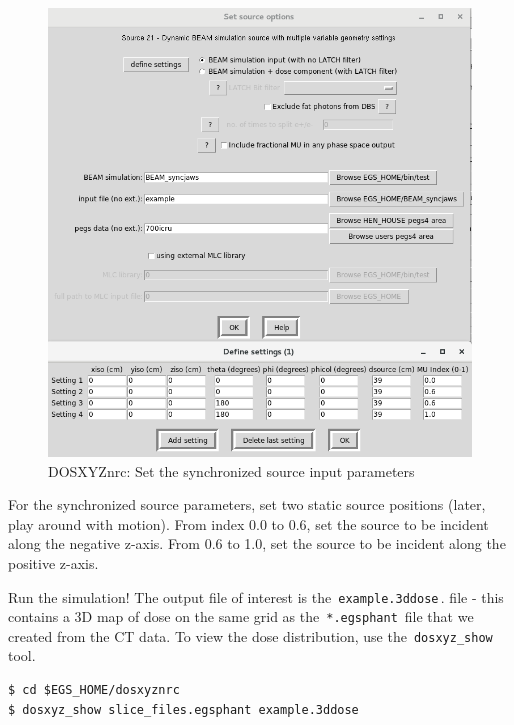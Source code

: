 \documentclass[12pt,twoside]{article}
\begin{document}
\begin{figure}
\begin{center}
\includegraphics[width=5in]{figures/dosxyz_step3}
\caption{DOSXYZnrc: Set the synchronized source input parameters}
\label{fig:dosxyz_step3}
\end{center}
\end{figure}

For the synchronized source parameters, set two static source positions (later, play around with motion). From index 0.0 to 0.6, set the source to be incident along the negative z-axis. From 0.6 to 1.0, set the source to be incident along the positive z-axis.

Run the simulation! The output file of interest is the \,\Verb|example.3ddose|\,. file - this contains a 3D map of dose on the same grid as the \,\Verb|*.egsphant|\, file that we created from the CT data. To view the dose distribution, use the \,\Verb|dosxyz_show|\, tool.

\begin{lstlisting}
$ cd $EGS_HOME/dosxyznrc
$ dosxyz_show slice_files.egsphant example.3ddose
\end{lstlisting}
\end{document}
